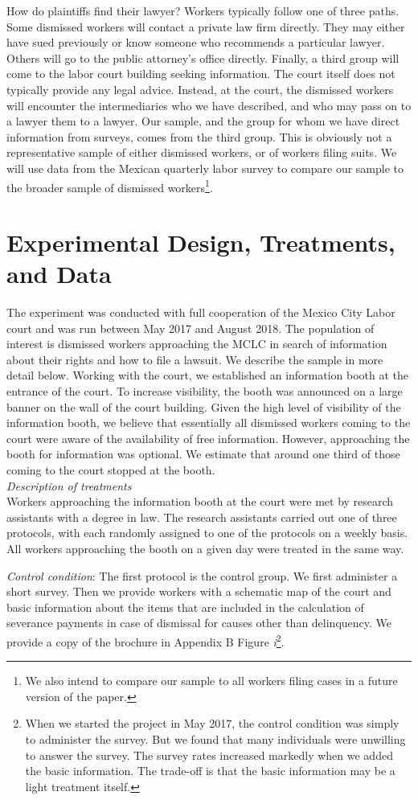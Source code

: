 \documentclass[oneside,12pt]{article}
\begin{document}
How do plaintiffs find their lawyer? Workers typically follow one of three paths. Some dismissed workers will contact a private law firm directly. They may either have sued previously or know someone who recommends a particular lawyer. Others will go to the public attorney’s office directly. Finally, a third group will come to the labor court building seeking information. The court itself does not typically provide any legal advice. Instead, at the court, the dismissed workers will encounter the intermediaries who we have described, and who may pass on to a lawyer them to a lawyer. Our sample, and the group for whom we have direct information from surveys, comes from the third group. This is obviously not a representative sample of either dismissed workers, or of workers filing suits. We will use data from the Mexican quarterly labor survey to compare our sample to the broader sample of dismissed workers\footnote{We also intend to compare our sample to all workers filing cases in a future version of the paper.}.

\section{Experimental Design, Treatments, and Data} \label{sec:data}
The experiment was conducted with full cooperation of the Mexico City Labor court and was run between May 2017 and August 2018. The population of interest is dismissed workers approaching the MCLC in search of information about their rights and how to file a lawsuit. We describe the sample in more detail below. Working with the court, we established an information booth at the entrance of the court. To increase visibility, the booth was announced on a large banner on the wall of the court building. Given the high level of visibility of the information booth, we believe that essentially all dismissed workers coming to the court were aware of the availability of free information. However, approaching the booth for information was optional. We estimate that around one third of those coming to the court stopped at the booth. 
\[\]
\noindent\emph{Description of treatments}\\
Workers approaching the information booth at the court were met by research assistants with a degree in law. The research assistants carried out one of three protocols, with each randomly assigned to one of the protocols on a weekly basis. All workers approaching the booth on a given day were treated in the same way. 

\emph{Control condition}: The first protocol is the control group. We first administer a short survey. Then we provide workers with a schematic map of the court and basic information about the items that are included in the calculation of severance payments in case of dismissal for causes other than delinquency. We provide a copy of the brochure in Appendix B Figure \emph{i}\footnote{When we started the project in May 2017, the control condition was simply to administer the survey. But we found that many individuals were unwilling to answer the survey. The survey rates increased markedly when we added the basic information. The trade-off is that the basic information may be a light treatment itself.}. 
\end{document}
